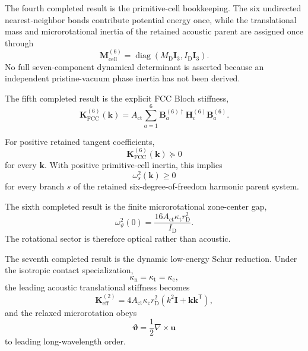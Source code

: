 The fourth completed result is the primitive-cell bookkeeping. The six undirected nearest-neighbor bonds contribute potential energy once, while the translational mass and microrotational inertia of the retained acoustic parent are assigned once through
\begin{equation}
    \mathbf{M}_{\mathrm{cell}}^{(6)}
    =
    \operatorname{diag}
    \left(
        M_{\mathrm{D}}\mathbf{I}_3,
        I_{\mathrm{D}}\mathbf{I}_3
    \right).
\end{equation}
No full seven-component dynamical determinant is asserted because an independent pristine-vacuum phase inertia has not been derived.

The fifth completed result is the explicit FCC Bloch stiffness,
\begin{equation}
    \mathbf{K}_{\mathrm{FCC}}^{(6)}(\mathbf{k})
    =
    A_{\mathrm{ct}}
    \sum_{a=1}^{6}
    \mathbf{B}_a^{(6)\dagger}
    \mathbf{H}_{\mathrm{c}}^{(6)}
    \mathbf{B}_a^{(6)}.
\end{equation}

For positive retained tangent coefficients,
\begin{equation}
    \mathbf{K}_{\mathrm{FCC}}^{(6)}(\mathbf{k})\succeq0
\end{equation}
for every $\mathbf{k}$. With positive primitive-cell inertia, this implies
\begin{equation}
    \omega_s^2(\mathbf{k})\geq0
\end{equation}
for every branch $s$ of the retained six-degree-of-freedom harmonic parent system.

The sixth completed result is the finite microrotational zone-center gap,
\begin{equation}
    \omega_{\vartheta}^2(0)
    =
    \frac{
        16A_{\mathrm{ct}}\kappa_{\mathrm{t}}r_{\mathrm{D}}^2
    }{
        I_{\mathrm{D}}
    }.
\end{equation}
The rotational sector is therefore optical rather than acoustic.

The seventh completed result is the dynamic low-energy Schur reduction. Under the isotropic contact specialization,
\begin{equation}
    \kappa_{\mathrm{n}}=\kappa_{\mathrm{t}}=\kappa_{\mathrm{c}},
\end{equation}
the leading acoustic translational stiffness becomes
\begin{equation}
    \mathbf{K}_{\mathrm{eff}}^{(2)}
    =
    4A_{\mathrm{ct}}\kappa_{\mathrm{c}}r_{\mathrm{D}}^2
    \left(
        k^2\mathbf{I}
        +
        \mathbf{k}\mathbf{k}^{\mathsf{T}}
    \right),
\end{equation}
and the relaxed microrotation obeys
\begin{equation}
    \boldsymbol{\vartheta}
    =
    \frac12\nabla\times\mathbf{u}
\end{equation}
to leading long-wavelength order.

